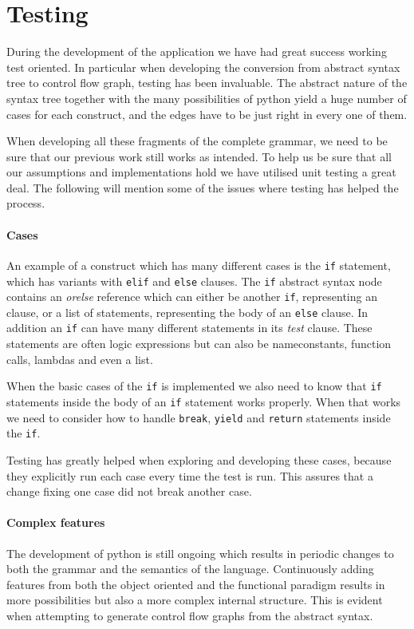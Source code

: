 \section{Testing}
During the development of the application we have had great success working test oriented.
In particular when developing the conversion from abstract syntax tree to control flow graph, testing has been invaluable.
The abstract nature of the syntax tree together with the many possibilities of python yield a huge number of cases for each construct, and the edges have to be just right in every one of them.

When developing all these fragments of the complete grammar, we need to be sure that our previous work still works as intended.
To help us be sure that all our assumptions and implementations hold we have utilised unit testing a great deal.
The following will mention some of the issues where testing has helped the process.

\paragraph{Cases}
An example of a construct which has many different cases is the \texttt{if} statement, which has variants with \texttt{elif} and \texttt{else} clauses.
The \texttt{if} abstract syntax node contains an \emph{orelse} reference which can either be another \texttt{if}, representing an  clause, or a list of statements, representing the body of an \texttt{else} clause.
In addition an \texttt{if} can have many different statements in its \emph{test} clause.
These statements are often logic expressions but can also be nameconstants, function calls, lambdas and even a list.

When the basic cases of the \texttt{if} is implemented we also need to know that \texttt{if} statements inside the body of an \texttt{if} statement works properly.
When that works we need to consider how to handle \texttt{break}, \texttt{yield} and \texttt{return} statements inside the \texttt{if}.

Testing has greatly helped when exploring and developing these cases, because they explicitly run each case every time the test is run.
This assures that a change fixing one case did not break another case.

\paragraph{Complex features}
The development of python is still ongoing which results in periodic changes to both the grammar and the semantics of the language.
Continuously adding features from both the object oriented and the functional paradigm results in more possibilities but also a more complex internal structure.
This is evident when attempting to generate control flow graphs from the abstract syntax.

